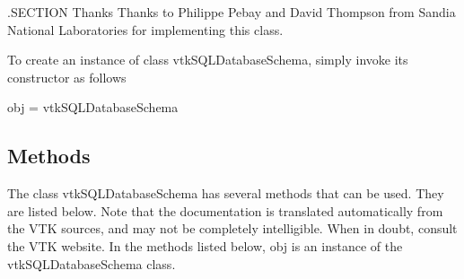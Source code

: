 .S\-E\-C\-T\-I\-O\-N Thanks Thanks to Philippe Pebay and David Thompson from Sandia National Laboratories for implementing this class.

To create an instance of class vtk\-S\-Q\-L\-Database\-Schema, simply invoke its constructor as follows \begin{DoxyVerb}  obj = vtkSQLDatabaseSchema
\end{DoxyVerb}
 \hypertarget{vtkwidgets_vtkxyplotwidget_Methods}{}\subsection{Methods}\label{vtkwidgets_vtkxyplotwidget_Methods}
The class vtk\-S\-Q\-L\-Database\-Schema has several methods that can be used. They are listed below. Note that the documentation is translated automatically from the V\-T\-K sources, and may not be completely intelligible. When in doubt, consult the V\-T\-K website. In the methods listed below, {\ttfamily obj} is an instance of the vtk\-S\-Q\-L\-Database\-Schema class. 
